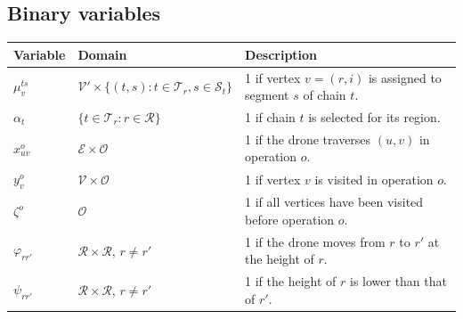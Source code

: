 \documentclass[12pt]{article}
\begin{document}
\subsection{Binary variables}
\begin{center}
\begin{tabular}{lll}
\toprule
Variable & Domain & Description \\
\midrule
$\mu_v^{ts}$ & $\mathcal V' \times \{(t,s): t\in\mathcal T_r, s\in\mathcal S_t\}$ & 1 if vertex $v=(r,i)$ is assigned to segment $s$ of chain $t$. \\
$\alpha_t$ & $\{t\in\mathcal T_r : r\in\mathcal R\}$ & 1 if chain $t$ is selected for its region. \\
$x_{uv}^o$ & $\mathcal E \times \mathcal O$ & 1 if the drone traverses $(u,v)$ in operation $o$. \\
$y_v^o$ & $\mathcal V \times \mathcal O$ & 1 if vertex $v$ is visited in operation $o$. \\
$\zeta^o$ & $\mathcal O$ & 1 if all vertices have been visited before operation $o$. \\
$\varphi_{rr'}$ & $\mathcal R \times \mathcal R$, $r\neq r'$ & 1 if the drone moves from $r$ to $r'$ at the height of $r$. \\
$\psi_{rr'}$ & $\mathcal R \times \mathcal R$, $r\neq r'$ & 1 if the height of $r$ is lower than that of $r'$. \\
\bottomrule
\end{tabular}
\end{center}
\end{document}

